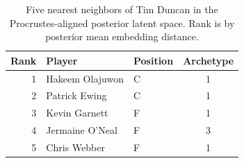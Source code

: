 \begin{table}[htbp]
  \centering\small
  \begin{tabular}{rllc}
    \toprule
    Rank & Player & Position & Archetype \\
    \midrule
    1 & Hakeem Olajuwon & C & 1 \\
    2 & Patrick Ewing & C & 1 \\
    3 & Kevin Garnett & F & 1 \\
    4 & Jermaine O'Neal & F & 3 \\
    5 & Chris Webber & F & 1 \\
    \bottomrule
  \end{tabular}
  \caption{Five nearest neighbors of Tim Duncan in the Procrustes-aligned posterior latent space. Rank is by posterior mean embedding distance.}
  \label{tab:Tim_Duncan_neighbors}
\end{table}


